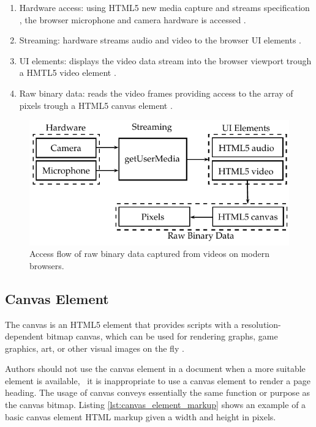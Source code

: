 \begin{enumerate}
  \item  Hardware access: using HTML5 \cite{Hickson2013} new media capture and streams specification \cite{MediaCapture2013}, the browser microphone and camera hardware is accessed \cite{WebRTC2013}.
  \item Streaming: hardware streams audio and video to the browser UI elements \cite{WebRTC2013}.
  \item UI elements: displays the video data stream into the browser viewport trough a HMTL5 video element \cite{WC2006}.
  \item Raw binary data: reads the video frames providing access to the array of pixels trough a HTML5 canvas element \cite{WC2006}.
\end{enumerate}

\begin{figure}[!htb]
  \centering
  \includegraphics{chapters/basic_concepts/get_user_media.pdf}
  \caption{Access flow of raw binary data captured from videos on modern browsers.}
  \label{figure:get_user_media}
\end{figure}


\subsection{Canvas Element} %
\label{sub:basic_concepts:web:canvas_element}

The canvas \cite{Canvas2013} is an HTML5 \cite{Hickson2013} element that provides scripts with a resolution-dependent bitmap canvas, which can be used for rendering graphs, game graphics, art, or other visual images on the fly \cite{Canvas2013}.

Authors should not use the canvas element in a document when a more suitable element is available, \eg\ it is inappropriate to use a canvas element to render a page heading. The usage of canvas conveys essentially the same function or purpose as the canvas bitmap. Listing \ref{lst:canvas_element_markup} shows an example of a basic canvas element HTML markup given a width and height in pixels.

